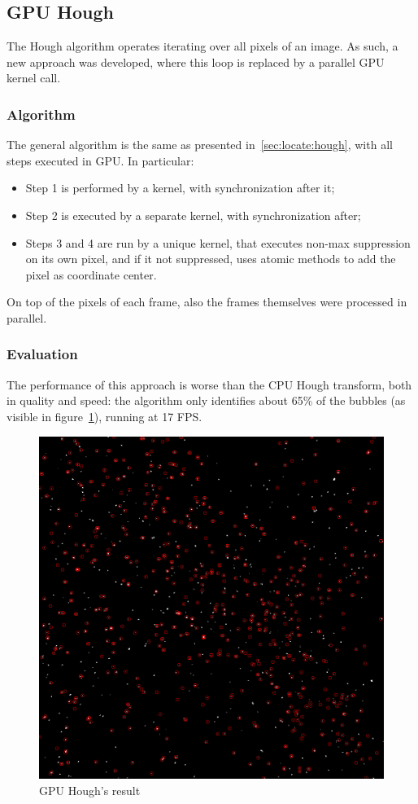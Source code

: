 \subsection{GPU Hough}

The Hough algorithm operates iterating over all pixels of an image.
As such, a new approach was developed, where this loop is replaced by a parallel GPU kernel call.

\subsubsection{Algorithm}

The general algorithm is the same as presented in~\ref{sec:locate:hough}, with all steps executed in GPU.
In particular:
\begin{itemize}
	\itemsep 0em
	\item Step 1 is performed by a kernel, with synchronization after it;
	\item Step 2 is executed by a separate kernel, with synchronization after;
	\item Steps 3 and 4 are run by a unique kernel, that executes non-max suppression on its own pixel, and if it not suppressed, uses atomic methods to add the pixel as coordinate center.
\end{itemize}
On top of the pixels of each frame, also the frames themselves were processed in parallel.

\subsubsection{Evaluation}

The performance of this approach is worse than the CPU Hough transform, both in quality and speed: the algorithm only identifies about 65\% of the bubbles (as visible in figure~\ref{fig:locate:gpu-hough}), running at 17 FPS.

\begin{figure}
	\centerline{\includegraphics[width=\locateimgsize]{images/locate/my-hough-transform.png}}
	\caption{\centering GPU Hough's result}
	\label{fig:locate:gpu-hough}
\end{figure}
